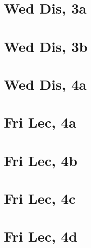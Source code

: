 \documentclass[12pt]{article}
\begin{document}
\section{Wed Dis, 3a}

\section{Wed Dis, 3b}

\section{Wed Dis, 4a}


\section{Fri Lec, 4a}

\section{Fri Lec, 4b}

\section{Fri Lec, 4c}

\section{Fri Lec, 4d}
\end{document}
